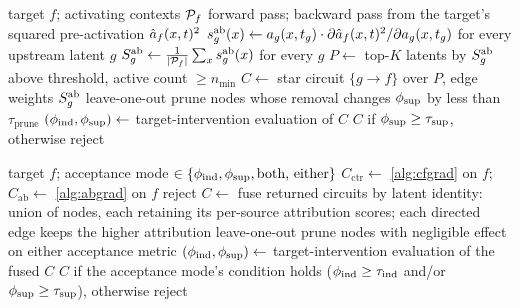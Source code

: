 \documentclass[10pt]{article}
\begin{document}
\begin{algorithm}
\caption{Ablation gradient discovery (one target $f$)}
\label{alg:abgrad}
\begin{algorithmic}[1]
\Require target $f$; activating contexts $\mathcal{P}_f$
    \State forward pass; backward pass from the target's squared pre-activation $\hat{a}_f(x, t)^{2}$ 
    \State $s_g^{\mathrm{ab}}(x) \gets a_g(x, t_g) \cdot \partial \hat{a}_f(x, t)^{2} / \partial a_g(x, t_g)$ for every upstream latent $g$
\EndFor
\State $S_g^{\mathrm{ab}} \gets \frac{1}{|\mathcal{P}_f|}\sum_{x} s_g^{\mathrm{ab}}(x)$ for every $g$
\State $P \gets$ top-$K$ latents by $S_g^{\mathrm{ab}}$ above threshold, active count $\geq n_{\min}$
\State $C \gets$ star circuit $\{g \to f\}$ over $P$, edge weights $S_g^{\mathrm{ab}}$
    \State leave-one-out prune nodes whose removal changes $\phi_{\mathrm{sup}}$ by less than $\tau_{\mathrm{prune}}$
\EndIf
\State $(\phi_{\mathrm{ind}}, \phi_{\mathrm{sup}}) \gets$ target-intervention evaluation of $C$
\State \Return $C$ if $\phi_{\mathrm{sup}} \geq \tau_{\mathrm{sup}}$, otherwise reject
\end{algorithmic}
\end{algorithm}

\begin{algorithm}
\caption{Hybrid gradient discovery (one target $f$)}
\label{alg:hybrid}
\begin{algorithmic}[1]
\Require target $f$; acceptance mode $\in \{\phi_{\mathrm{ind}}, \phi_{\mathrm{sup}}, \text{both, either}\}$
\State $C_{\mathrm{ctr}} \gets$ \cref{alg:cfgrad} on $f$;\quad $C_{\mathrm{ab}} \gets$ \cref{alg:abgrad} on $f$ 
 \State \Return reject \EndIf
\State $C \gets$ fuse returned circuits by latent identity: union of nodes, each retaining its per-source attribution scores; each directed edge keeps the higher attribution
    \State leave-one-out prune nodes with negligible effect on either acceptance metric
\EndIf
\State $(\phi_{\mathrm{ind}}, \phi_{\mathrm{sup}}) \gets$ target-intervention evaluation of the fused $C$
\State \Return $C$ if the acceptance mode's condition holds ($\phi_{\mathrm{ind}} \geq \tau_{\mathrm{ind}}$ and/or $\phi_{\mathrm{sup}} \geq \tau_{\mathrm{sup}}$), otherwise reject
\end{algorithmic}
\end{algorithm}
\end{document}
